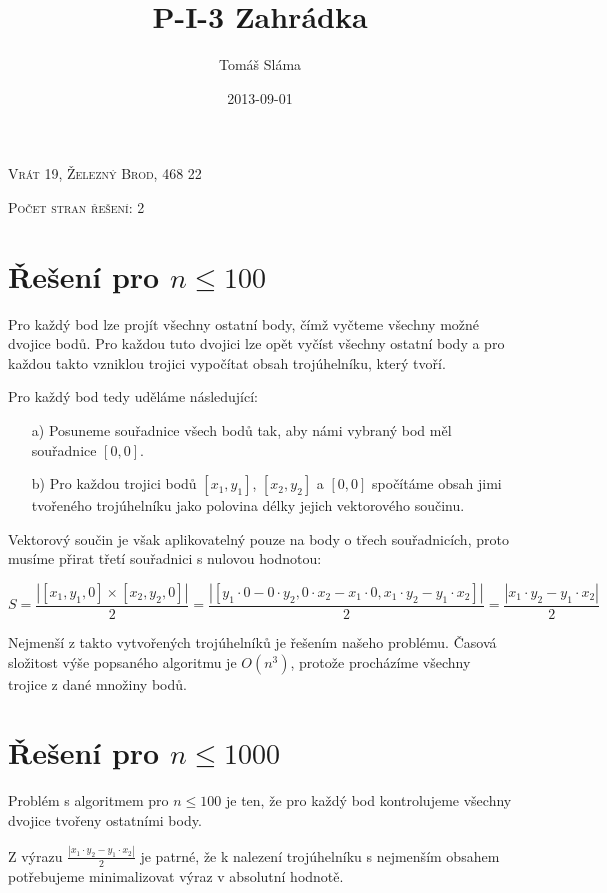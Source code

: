 \documentclass[a4paper, 12pt]{article}
\title{P-I-3 Zahrádka}
\date{2013-09-01}
\author{Tomáš Sláma}
\date{}
\begin{document}
  \maketitle

  \bigskip
  \begin{center}
    \textsc{Vrát 19, Železný Brod, 468 22}

    \textsc{Počet stran řešení: 2}
  \end{center}

  \newpage

  \section{Řešení pro $n\le100$}
  Pro každý bod lze projít všechny ostatní body, čímž vyčteme všechny možné dvojice bodů. Pro každou tuto dvojici lze opět vyčíst všechny ostatní body a pro každou takto vzniklou trojici vypočítat obsah trojúhelníku, který tvoří.

  Pro každý bod tedy uděláme následující:
  \begin{itemize}
    \item[a)] Posuneme souřadnice všech bodů tak, aby námi vybraný bod měl souřadnice $[0,0]$.
    \item[b)] Pro každou trojici bodů $[x_1,y_1]$, $[x_2,y_2]$ a $[0,0]$ spočítáme obsah jimi tvořeného trojúhelníku jako polovina délky jejich vektorového součinu.
  \end{itemize}

  Vektorový součin je však aplikovatelný pouze na body o třech souřadnicích, proto musíme přirat třetí souřadnici s nulovou hodnotou:

  $$
  S=\frac{| [x_1,y_1,0]\times[x_2,y_2,0] |}{2}
  =\frac{| [y_1 \cdot 0 - 0 \cdot y_2, 0 \cdot x_2 - x_1 \cdot 0, x_1 \cdot y_2 - y_1 \cdot x_2] |}{2}
  =\frac{| x_1 \cdot y_2 - y_1 \cdot x_2 |}{2}
  $$

  Nejmenší z takto vytvořených trojúhelníků je řešením našeho problému. Časová složitost výše popsaného algoritmu je $O(n^3)$, protože procházíme všechny trojice z dané množiny bodů.

  \section{Řešení pro $n\le1000$}
  Problém s algoritmem pro $n\le100$ je ten, že pro každý bod kontrolujeme všechny dvojice tvořeny ostatními body.

  Z výrazu $\frac{| x_1 \cdot y_2 - y_1 \cdot x_2 |}{2}$ je patrné, že k nalezení trojúhelníku s nejmenším obsahem potřebujeme minimalizovat výraz v absolutní hodnotě.
\end{document}
